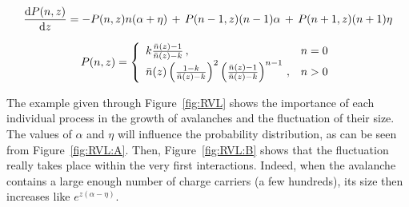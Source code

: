 	\begin{equation}
	\label{eq:dRLV}
	\frac{\mathrm{d}{P(n,z)}}{\mathrm{d}{z}} = -P(n,z)n(\alpha+\eta) \, + \, P(n-1,z)(n-1)\alpha \, + \, P(n+1,z)(n+1)\eta
	\end{equation}
	
	\begin{equation}
	\label{eq:sol-RLV}
	P(n,z) = \left\{
				\begin{array}{l l}
  				k\frac{\bar{n}(z)-1}{\bar{n}(z)-k} \, , & n=0\\
  				\bar{n}(z) \left( \frac{1-k}{\bar{n}(z)-k} \right)^2 \left( \frac{\bar{n}(z)-1}{\bar{n}(z)-k} \right)^{n-1} \, , & n>0\\
  				\end{array} \right.
	\end{equation}
	
	The example given through Figure~\ref{fig:RVL} shows the importance of each individual process in the growth of avalanches and the fluctuation of their size. The values of $\alpha$ and $\eta$ will influence the probability distribution, as can be seen from Figure~\ref{fig:RVL:A}. Then, Figure~\ref{fig:RVL:B} shows that the fluctuation really takes place within the very first interactions. Indeed, when the avalanche contains a large enough number of charge carriers (a few hundreds), its size then increases like $e^{z(\alpha-\eta)}$.
	
